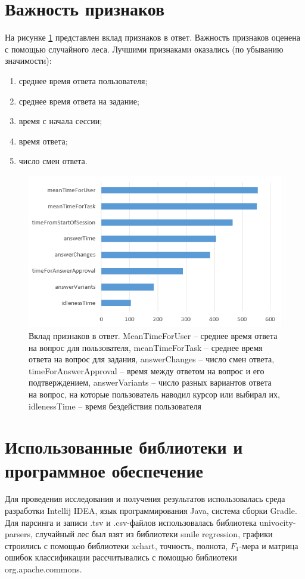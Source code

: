\documentclass[specification,annotation,times]{itmo-student-thesis}
\begin{document}
\section{Важность признаков}
На рисунке \ref{fig:activity} представлен вклад признаков в ответ. Важность признаков оценена с помощью случайного леса. Лучшими признаками оказались (по убыванию значимости):
\begin{enumerate}
    \item среднее время ответа пользователя;
    \item среднее время ответа на задание;
    \item время с начала сессии;
    \item время ответа;
    \item число смен ответа.
\end{enumerate}
\begin{figure}
  \includegraphics{features_importance.PNG}
  \caption{Вклад признаков в ответ. MeanTimeForUser -- среднее время ответа на вопрос для пользователя, meanTimeForTask -- среднее время ответа на вопрос для задания, answerChanges -- число смен ответа, timeForAnswerApproval -- время между ответом на вопрос и его подтверждением, answerVariants -- число разных вариантов ответа на вопрос, на которые пользователь наводил курсор или выбирал их, idlenessTime -- время бездействия пользователя }
  \label{fig:activity}
\end{figure}

\section{Использованные библиотеки и программное обеспечение}
Для проведения исследования и получения результатов использовалась среда разработки Intellij IDEA, язык программирования Java, система сборки Gradle. Для парсинга и записи .tsv и .csv-файлов использовалась библиотека univocity-parsers, случайный лес был взят из библиотеки smile regression, графики строились с помощью библиотеки xchart, точность, полнота, $F_{1}$-мера и матрица ошибок классификации рассчитывались с помощью библиотеки org.apache.commons.
\end{document}
